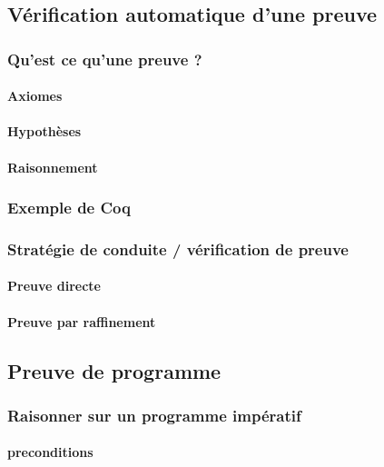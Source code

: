 		\subsection{Vérification automatique d'une preuve}

			\subsubsection{Qu'est ce qu'une preuve ?}

				\paragraph{Axiomes}
				\paragraph{Hypothèses}
				\paragraph{Raisonnement}

			\subsubsection{Exemple de Coq}

			\subsubsection{Stratégie de conduite / vérification de preuve}

				\paragraph{Preuve directe}
				\paragraph{Preuve par raffinement}

		\subsection{Preuve de programme}

			\subsubsection{Raisonner sur un programme impératif}

				\paragraph{preconditions}

